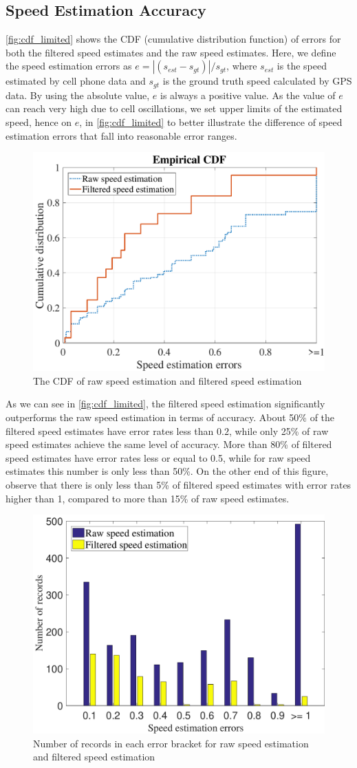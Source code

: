 \subsection{Speed Estimation Accuracy}

\autoref{fig:cdf_limited} shows the CDF (cumulative distribution function) of errors for both the filtered speed estimates and the raw speed estimates. Here, we define the speed estimation errors as $e = |(s_{est} - s_{gt})| / s_{gt}$, where $s_{est}$ is the speed estimated by cell phone data and $s_{gt}$ is the ground truth speed calculated by GPS data. By using the absolute value, $e$ is always a positive value. As the value of $e$ can reach very high due to cell oscillations, we set upper limits of the estimated speed, hence on $e$, in \autoref{fig:cdf_limited} to better illustrate the difference of speed estimation errors that fall into reasonable error ranges.

\begin{figure}[h]
    \centering
    \includegraphics[width=0.5\linewidth]{./figures/cdf_limited.pdf}
    \caption{The CDF of raw speed estimation and filtered speed estimation}
    \label{fig:cdf_limited}
\end{figure}

As we can see in \autoref{fig:cdf_limited}, the filtered speed estimation significantly outperforms the raw speed estimation in terms of accuracy. About 50\% of the filtered speed estimates have error rates less than $0.2$, while only 25\% of raw speed estimates achieve the same level of accuracy. More than 80\% of filtered speed estimates have error rates less or equal to 0.5, while for raw speed estimates this number is only less than 50\%. On the other end of this figure, observe that there is only less than 5\% of filtered speed estimates with error rates higher than 1, compared to more than 15\% of raw speed estimates.


\begin{figure}[h]
    \centering
    \includegraphics[width=0.5\linewidth]{./figures/error_bar.pdf}
    \caption{Number of records in each error bracket for raw speed estimation and filtered speed estimation}
    \label{fig:error_bar}
\end{figure}


